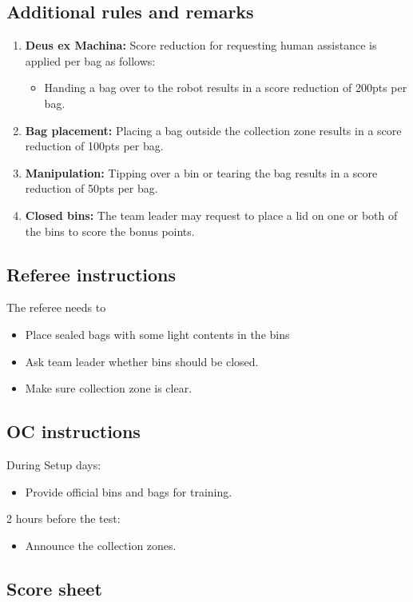 \subsection{Additional rules and remarks}
\begin{enumerate}[nosep]
	\item \textbf{Deus ex Machina:} Score reduction for requesting human assistance is applied per bag as follows:
	\begin{itemize}[nosep]
		\item Handing a bag over to the robot results in a score reduction of 200pts per bag.
	\end{itemize}

	\item \textbf{Bag placement:} Placing a bag outside the collection zone results in a score reduction of 100pts per bag.
	\item \textbf{Manipulation:}  Tipping over a bin or tearing the bag results in a score reduction of 50pts per bag.
	\item \textbf{Closed bins:} The team leader may request to place a lid on one or both of the bins to score the bonus points.

\end{enumerate}

\subsection{Referee instructions}

The referee needs to
\begin{itemize}
	\item Place sealed bags with some light contents in the bins
	\item Ask team leader whether bins should be closed.
	\item Make sure collection zone is clear.
\end{itemize}

\subsection{OC instructions}
During Setup days:
\begin{itemize}
	\item Provide official bins and bags for training.
\end{itemize}

2 hours before the test:
\begin{itemize}
	\item Announce the collection zones.
\end{itemize}

\subsection{Score sheet}



